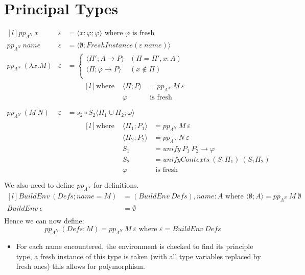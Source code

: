 \section{Principal Types}
\[\begin{matrix*}[l]
    pp_{\Lambda^N} \ x & \varepsilon & = \langle x: \varphi ; \varphi \rangle \text{ where } \varphi \text{ is fresh} \\
    pp_{\Lambda^N} \ name & \varepsilon & = \langle \emptyset ; FreshInstance(\varepsilon \ name) \rangle \\
    pp_{\Lambda^N} \ (\lambda x . M) & \varepsilon & = \begin{cases}
        \langle \Pi'; A \to P \rangle & (\Pi = \Pi', x:A) \\
        \langle \Pi; \varphi \to P \rangle & (x \not\in \Pi) \\
    \end{cases} \\
    & & \qquad \begin{matrix*}[l]
        \text{where } & \langle \Pi; P \rangle & = pp_{\Lambda^N} \ M \ \varepsilon \\
        & \varphi & \text{ is fresh} \\
    \end{matrix*} \\
    pp_{\Lambda^N} \ (M \ N) & \varepsilon & = s_2 \circ S_2 \langle \Pi_1 \cup \Pi_2 ; \varphi \rangle \\
    & & \qquad \begin{matrix*}[l]
        \text{where } & \langle \Pi_1 ; P_1 \rangle & = pp_{\Lambda^N} \ M \ \varepsilon \\
        & \langle \Pi_2 ; P_2 \rangle & = pp_{\Lambda^N} \ N \ \varepsilon \\
        & S_1 & = unify \ P_1 \ P_2 \to \varphi \\
        & S_2 & = unifyContexts \ (S_1 \Pi_1) \ (S_1 \Pi_2) \\
        & \varphi & \text{ is fresh} \\
    \end{matrix*}
\end{matrix*}\]
We also need to define $pp_{\Lambda^N}$ for definitions.
\[\begin{matrix*}[l]
    BuildEnv \ (Defs ; name = M) & = (BuildEnv \ Defs), name:A \text{ where } \langle \emptyset; A \rangle = pp_{\Lambda^N} \ M \ \emptyset \\
    BuildEnv \ \epsilon & = \emptyset \\
\end{matrix*}\]
Hence we can now define:
\[pp_{\Lambda^N} \ (Defs; M) = pp_{\Lambda^N} \ M \ \varepsilon \text{ where } \varepsilon = BuildEnv \ Defs\]
\begin{itemize}
    \item For each name encountered, the environment is checked to find its principle type, a fresh instance of this type is taken (with all type variables replaced by fresh ones) this allows for polymorphism.
\end{itemize}

